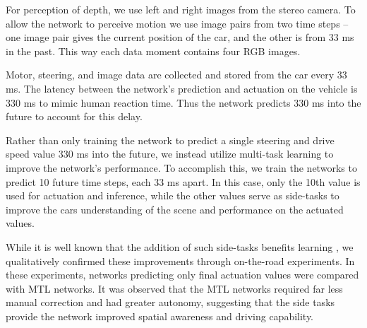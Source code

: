 For perception of depth, we use left and right images from the stereo camera. To allow the network to perceive motion we use image pairs from two time steps -- one image pair gives the current position of the car, and the other is from 33 ms in the past. This way each data moment contains four RGB images.

Motor, steering, and image data are collected and stored from the car every 33 ms.
The latency between the network's prediction and actuation on the vehicle is 330 ms to mimic human reaction time. Thus the network predicts 330 ms into the future to account for this delay.

Rather than only training the network to predict a single steering and drive speed value 330 ms into the future, we instead utilize multi-task learning to improve the network's performance. To accomplish this, we train the networks to predict 10 future time steps, each 33 ms apart. In this case, only the 10th value is used for actuation and inference, while the other values serve as side-tasks to improve the cars understanding of the scene and performance on the actuated values.

While it is well known that the addition of such side-tasks benefits learning \cite{caruana1998multitask}, we qualitatively confirmed these improvements through on-the-road experiments. In these experiments, networks predicting only final actuation values were compared with MTL networks. It was observed that the MTL networks required far less manual correction and had greater autonomy, suggesting that the side tasks provide the network improved spatial awareness and driving capability.
